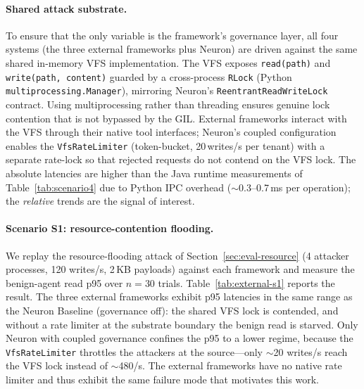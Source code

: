\paragraph{Shared attack substrate.}
To ensure that the only variable is the framework's governance layer,
all four systems (the three external frameworks plus Neuron) are driven
against the same shared in-memory VFS implementation. The VFS exposes
\texttt{read(path)} and \texttt{write(path, content)} guarded by a
cross-process \texttt{RLock} (Python \texttt{multiprocessing.Manager}),
mirroring Neuron's \texttt{ReentrantReadWriteLock} contract. Using
multiprocessing rather than threading ensures genuine lock contention
that is not bypassed by the GIL. External frameworks interact with the
VFS through their native tool interfaces; Neuron's coupled configuration
enables the \texttt{VfsRateLimiter} (token-bucket, 20\,writes/s per
tenant) with a separate rate-lock so that rejected requests do not
contend on the VFS lock. The absolute latencies are higher than the
Java runtime measurements of Table~\ref{tab:scenario4} due to Python IPC
overhead ($\sim$0.3--0.7\,ms per operation); the \emph{relative}
trends are the signal of interest.

\paragraph{Scenario S1: resource-contention flooding.}
We replay the resource-flooding attack of Section~\ref{sec:eval-resource}
(4 attacker processes, 120 writes/s, 2\,KB payloads) against each framework
and measure the benign-agent read p95 over $n=30$ trials.
Table~\ref{tab:external-s1} reports the result. The three external
frameworks exhibit p95 latencies in the same range as the Neuron Baseline
(governance off): the shared VFS lock is contended, and without a rate
limiter at the substrate boundary the benign read is starved. Only Neuron
with coupled governance confines the p95 to a lower regime, because the
\texttt{VfsRateLimiter} throttles the attackers at the source---only
$\sim$20 writes/s reach the VFS lock instead of $\sim$480/s. The
external frameworks have no native rate limiter and thus exhibit the
same failure mode that motivates this work.


